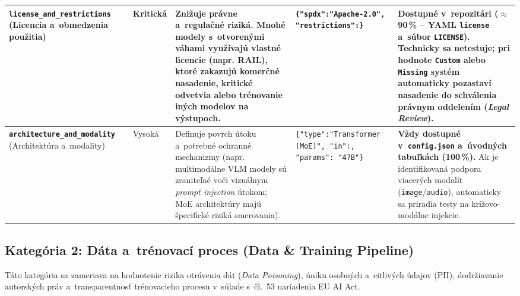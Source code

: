 {\begin{xltabular}{\textwidth}{@{}>{\raggedright\arraybackslash}p{2.6cm}>{\raggedright\arraybackslash}p{1.5cm}>{\raggedright\arraybackslash}X>{\raggedright\arraybackslash}p{3.1cm}>{\raggedright\arraybackslash}X@{}}
\textbf{\texttt{license\_\allowbreak and\_\allowbreak restrictions}} \newline (Licencia a~obmedzenia použitia) &
Kritická &
Znižuje právne a~regulačné riziká. Mnohé modely s~otvorenými váhami využívajú vlastné licencie (napr. RAIL), ktoré zakazujú komerčné nasadenie, kritické odvetvia alebo trénovanie iných modelov na výstupoch. &
\texttt{\{"spdx":\allowbreak "Apache-2.0", "restrictions":\}} &
\textbf{Dostupné v~repozitári ($\approx$90\,\% -- YAML \texttt{license} a~súbor \texttt{LICENSE}).} Technicky sa netestuje; pri hodnote \texttt{Custom} alebo \texttt{Missing} systém automaticky pozastaví nasadenie do schválenia právnym oddelením (\emph{Legal Review}). \\
\midrule

\textbf{\texttt{architecture\_\allowbreak and\_\allowbreak modality}} \newline (Architektúra a~modality) &
Vysoká &
Definuje povrch útoku a~potrebné ochranné mechanizmy (napr. multimodálne VLM modely sú zraniteľné voči vizuálnym \emph{prompt injection} útokom; MoE architektúry majú špecifické riziká smerovania). &
\texttt{\{"type":\allowbreak "Transformer (MoE)", "in":, "params": "47B"\}} &
\textbf{Vždy dostupné v~\texttt{config.json} a~úvodných tabuľkách (100\,\%).} Ak je identifikovaná podpora viacerých modalít (\texttt{image}/\texttt{audio}), automaticky sa priradia testy na krížovo-modálne injekcie. \\

\end{xltabular}
}

\subsection{Kategória 2: Dáta a~trénovací proces (Data \& Training Pipeline)}
\label{sec:kat-data}

Táto kategória sa zameriava na hodnotenie rizika otrávenia dát (\emph{Data
Poisoning}), úniku osobných a~citlivých údajov (PII), dodržiavanie autorských
práv a~transparentnosť trénovacieho procesu v~súlade s~čl.~53 nariadenia EU AI
Act.

